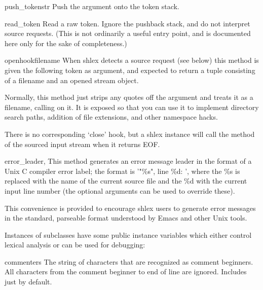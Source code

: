 \begin{methoddesc}{push_token}{str}
Push the argument onto the token stack.
\end{methoddesc}

\begin{methoddesc}{read_token}{}
Read a raw token.  Ignore the pushback stack, and do not interpret source
requests.  (This is not ordinarily a useful entry point, and is
documented here only for the sake of completeness.)
\end{methoddesc}

\begin{methoddesc}{openhook}{filename}
When shlex detects a source request (see  below)
this method is given the following token as argument, and expected to 
return a tuple consisting of a filename and an opened stream object. 

Normally, this method just strips any quotes off the argument and
treats it as a filename, calling  on it.  It is exposed so that
you can use it to implement directory search paths, addition of
file extensions, and other namespace hacks.

There is no corresponding `close' hook, but a shlex instance will call
the  method of the sourced input stream when it returns EOF.
\end{methoddesc}

\begin{methoddesc}{error_leader}{, }
This method generates an error message leader in the format of a
Unix C compiler error label; the format is '"\%s", line \%d: ',
where the \%s is replaced with the name of the current source file and
the \%d with the current input line number (the optional arguments
can be used to override these).

This convenience is provided to encourage shlex users to generate
error messages in the standard, parseable format understood by Emacs
and other Unix tools.
\end{methoddesc}

Instances of  subclasses have some public instance
variables which either control lexical analysis or can be used
for debugging:

\begin{memberdesc}{commenters}
The string of characters that are recognized as comment beginners.
All characters from the comment beginner to end of line are ignored.
Includes just \character{\#} by default.   
\end{memberdesc}

